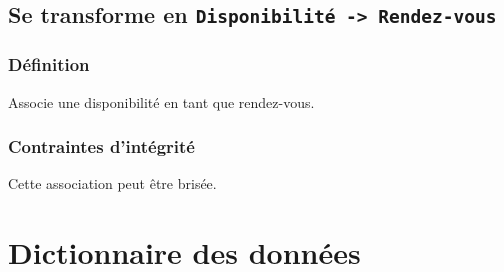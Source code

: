 \subsection{Se transforme en \texttt{Disponibilité -> Rendez-vous}}
\subsubsection{Définition}
Associe une disponibilité en tant que rendez-vous.
\subsubsection{Contraintes d'intégrité}
Cette association peut être brisée.
\newpage

\section{Dictionnaire des données}

